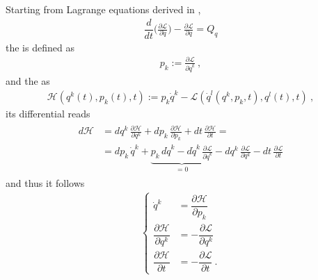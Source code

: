 \documentclass[letterpaper,10pt,english]{jupyterBook}
\begin{document}
\sphinxAtStartPar
Starting from Lagrange equations derived in {\hyperref[\detokenize{ch/lagrange:classical-mechanics-lagrange}]{}},
\begin{equation*}
\begin{split}\dfrac{d}{dt}\Big( \frac{\partial \mathscr{L}}{\partial \dot{q}} \Big) - \frac{\partial \mathscr{L}}{\partial q} = Q_q\end{split}
\end{equation*}
\sphinxAtStartPar
the  is defined as
\begin{equation*}
\begin{split}p_k := \frac{\partial \mathscr{L}}{\partial \dot{q}^k} \ ,\end{split}
\end{equation*}
\sphinxAtStartPar
and the  as
\begin{equation*}
\begin{split}\mathscr{H}(q^k(t), p_k(t), t) := p_k \dot{q}^k - \mathscr{L}(\dot{q}^l(q^k, p_k, t), q^l(t), t) \ ,\end{split}
\end{equation*}
\sphinxAtStartPar
its differential reads
\begin{equation*}
\begin{split}\begin{aligned}
d\mathscr{H} & = dq^k \, \frac{\partial \mathscr{H}}{\partial q^k} + dp_k \, \frac{\partial \mathscr{H}}{\partial p_k} + dt \,  \frac{\partial \mathscr{H}}{\partial t} = \\
& = d p_k \, \dot{q}^k + \underbrace{ p_k \, d \dot{q}^k - d \dot{q}^k \, \frac{\partial \mathscr{L}}{\partial \dot{q}^k}}_{=0} - d q^k \, \frac{\partial \mathscr{L}}{\partial q^k} - dt \, \frac{\partial \mathscr{L}}{\partial t}
\end{aligned}\end{split}
\end{equation*}
\sphinxAtStartPar
and thus it follows
\begin{equation*}
\begin{split}\begin{cases}
 \dot{q}^k & = \dfrac{\partial \mathscr{H}}{\partial p_k} \\
 \dfrac{\partial \mathscr{H}}{\partial q^k} & = - \dfrac{\partial \mathscr{L}}{\partial q^k} \\
 \dfrac{\partial \mathscr{H}}{\partial t} & = - \dfrac{\partial\mathscr{L}}{\partial t} \ .
\end{cases}\end{split}
\end{equation*}
\end{document}
